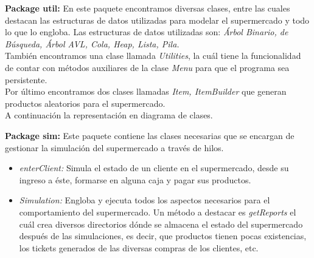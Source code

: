 \documentclass[letterpaper,11pt]{article}
\begin{document}
\textbf{Package util: } En este paquete encontramos diversas clases, entre las cuales destacan las estructuras de datos utilizadas para modelar el supermercado y todo lo que lo engloba. Las estructuras de datos utilizadas son: \textit{Árbol Binario, de Búsqueda, Árbol AVL, Cola, Heap, Lista, Pila.}\\

También encontramos una clase llamada \textit{Utilities}, la cuál tiene la funcionalidad de contar con métodos auxiliares de la clase \textit{Menu } para que el programa sea persistente.\\
Por último encontramos dos clases llamadas \textit{Item, ItemBuilder} que generan productos aleatorios para el supermercado.\\
A continuación la representación en diagrama de clases.
\newpage

\textbf{Package sim: } Este paquete contiene las clases necesarias que se encargan de gestionar la simulación del supermercado a través de hilos.
\begin{itemize}
	\item \textit{enterClient: } Simula el estado de un cliente en el supermercado, desde su ingreso a éste, formarse en alguna caja y pagar sus productos.
\end{itemize}
\begin{itemize}
	\item \textit{Simulation: } Engloba y ejecuta todos los aspectos necesarios para el comportamiento del supermercado. Un método a destacar es \textit{getReports} el cuál crea diversos directorios dónde se almacena el estado del supermercado después de las simulaciones, es decir, que productos tienen pocas existencias, los tickets generados de las diversas compras de los clientes, etc.
\end{itemize}
\end{document}
